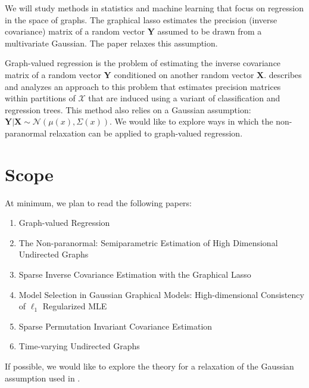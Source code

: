 \documentclass[12pt]{article}
\begin{document}
We will study methods in statistics and machine learning that focus on
regression in the space of graphs. The graphical lasso
\cite{friedman2008} estimates the precision (inverse covariance)
matrix of a random vector $\boldsymbol{Y}$ assumed to be drawn from a
multivariate Gaussian. The paper \cite{liu2009} relaxes this
assumption.

Graph-valued regression is the problem of estimating the inverse
covariance matrix of a random vector $\boldsymbol{Y}$ conditioned on
another random vector $\boldsymbol{X}$. \cite{liu2010} describes and
analyzes an approach to this problem that estimates precision matrices
within partitions of $\boldsymbol{\mathcal{X}}$ that are induced using
a variant of classification and regression trees. This method also
relies on a Gaussian assumption: $\boldsymbol{Y} | \boldsymbol{X} \sim
\mathcal{N}(\mu(x), \Sigma(x))$. We would like to explore ways in
which the non-paranormal relaxation can be applied to graph-valued
regression.

\section{Scope}
\label{sec:scope}

At minimum, we plan to read the following papers:

\begin{enumerate}[1.]
\item Graph-valued Regression \cite{liu2010}
\item The Non-paranormal: Semiparametric Estimation of High Dimensional Undirected Graphs \cite{liu2009}
\item Sparse Inverse Covariance Estimation with the Graphical Lasso \cite{friedman2008}
\item Model Selection in Gaussian Graphical Models: High-dimensional Consistency of $\ell_1$ Regularized MLE \cite{ravikumar2008}
\item Sparse Permutation Invariant Covariance Estimation \cite{rothman2008}
\item Time-varying Undirected Graphs \cite{zhou2010}
\end{enumerate}

If possible, we would like to explore the theory for a relaxation of
the Gaussian assumption used in \cite{liu2010}.



\end{document}
